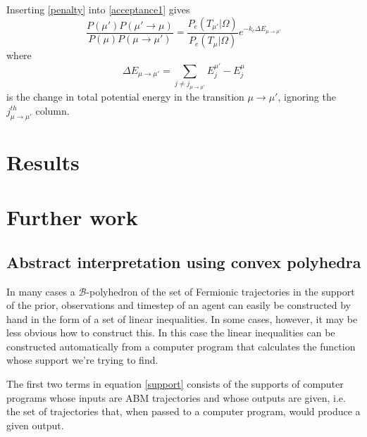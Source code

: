 \documentclass{article}
\begin{document}
Inserting \ref{penalty} into \ref{acceptance1} gives
\[
\frac{P(\mu')P(\mu'\to\mu)}{P(\mu)P(\mu\to\mu')} 
=
\frac{P_e(T_{\mu'}|\Omega)}{P_e(T_\mu|\Omega)}
e^{-k_c\Delta E_{\mu\to\mu'}}
\]
where
\[
\Delta E_{\mu\to\mu'} = \sum_{j\ne j_{\mu\to\mu'}} E^{\mu'}_j - E^\mu_j
\]
is the change in total potential energy in the transition $\mu\to\mu'$, ignoring the $j_{\mu\to\mu'}^{th}$ column.



\section{Results}

\section{Further work}
\subsection{Abstract interpretation using convex polyhedra}

In many cases a $\mathcal{B}$-polyhedron of the set of Fermionic trajectories in the support of the prior, observations and timestep of an agent can easily be constructed by hand in the form of a set of linear inequalities. In some cases, however, it may be less obvious how to construct this. In this case the linear inequalities can be constructed automatically from a computer program that calculates the function whose support we're trying to find.





The first two terms in equation \ref{support} consists of the supports of computer programs whose inputs are ABM trajectories and whose outputs are given, i.e. the set of trajectories that, when passed to a computer program, would produce a given output.
\end{document}
